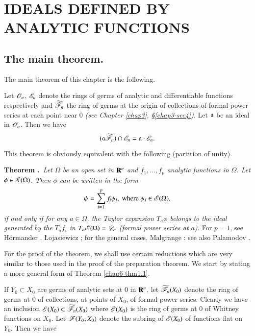 \chapter{IDEALS DEFINED BY ANALYTIC FUNCTIONS}\label{chap6}
\pageoriginale

\section[The main theorem]{The main theorem.}\label{chap6-sec1}

The main theorem of this chapter is the following.

\begin{theorem}\label{chap6-thm1.1}
Let $\mathscr{O}_{n}$, $\mathscr{E}_{n}$ denote the rings of germs of analytic and differentiable functions respectively and $\widetilde{\mathscr{F}}_{n}$ the ring of germs at the origin of collections of formal power series at each point near $0$ {\em (see Chapter \ref{chap3}, \S\ref{chap3-sec4})}. Let $\mathfrak{a}$ be an ideal in $\mathscr{O}_{n}$. Then we have
$$
(\mathfrak{a}\widetilde{\mathscr{F}}_{n})\cap\mathscr{E}_{n}=\mathfrak{a}\cdot \mathscr{E}_{n}.
$$
\end{theorem}

This theorem is obviously equivalent with the following (partition of unity).

\medskip
\noindent
{\bf Theorem .\label{chap6-thm1.1'}}~{\em Let $\Omega$ be an open set in $\mathbf{R}^{n}$ and $f_{1},\ldots,f_{p}$ analytic functions in $\Omega$. Let $\phi\in\mathscr{E}(\Omega)$. Then $\phi$ can be written in the form}
$$
\psi =\sum\limits^{p}_{i=1}f_{i}\psi_{i},\text{ where } \psi_{i}\in \mathscr{E}(\Omega),
$$
{\em if and only if for any $a\in \Omega$, the Taylor expansion $T_{a}\phi$ belongs to the ideal generated by the $T_{a}f_{i}$ in $T_{a}\mathscr{E}(\Omega)=\mathscr{D}_{a}$ (formal power series at $a$).} For $p=1$, see H\"ormander \cite{L. Hormander : 1}, {\L}ojasiewicz \cite{S. Lojasiewicz : 1}; for the general cases, Malgrange \cite{B. Malgrange : 1}: see also Palamodov \cite{V. P. Palamodov : 1}.

For the proof of the theorem, we shall use certain reductions which are very similar to those used in the proof of the preparation theorem. We start by stating a more general form of Theorem \ref{chap6-thm1.1}.

If $Y_{0}\subset X_{0}$ are germs of analytic sets at $0$ in $\mathbf{R}^{n}$, let $\widetilde{\mathscr{F}}_{n}(X_{0})$ denote the ring of germs at $0$ of collections, at points of $X_{0}$, of formal power series. Clearly we have an inclusion $\mathscr{E}(X_{0})\subset \widetilde{\mathscr{F}}_{n}(X_{0})$ where $\mathscr{E}(X_{0})$ is the ring of germs at $0$ of Whitney functions on $X_{0}$. Let $\mathscr{F}(Y_{0};X_{0})$ denote the subring of $\mathscr{E}(X_{0})$ of functions flat on $Y_{0}$. Then we have

